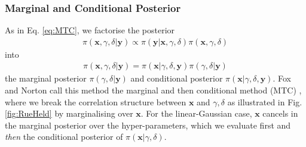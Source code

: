 \subsubsection{Marginal and Conditional Posterior}
\label{subsec:MTC}
As in Eq. \ref{eq:MTC}, we factorise the posterior
\begin{align}
	\pi( \bm{x}, \gamma, \delta| \bm{y}) \propto \pi(\bm{y}| \bm{x}, \gamma, \delta) \pi( \bm{x}, \gamma, \delta)
\end{align}
into 
\begin{align}
	\pi( \bm{x}, \gamma, \delta| \bm{y}) =\pi( \bm{x}|\gamma, \delta, \bm{y})\pi(\gamma, \delta | \bm{y})
\end{align}
the marginal posterior $\pi(\gamma, \delta | \bm{y})$ and conditional posterior $\pi( \bm{x}|\gamma, \delta, \bm{y})$.
Fox and Norton call this method the marginal and then conditional method (MTC) \cite{fox2016fast}, where we break the correlation structure between $\bm{x}$ and $\gamma, \delta$ as illustrated in Fig. \ref{fig:RueHeld} by marginalising over $\bm{x}$.
For the linear-Gaussian case, $\bm{x}$ cancels in the marginal posterior over the hyper-parameters, which we evaluate first and \textit{then} the conditional posterior of $\pi(\bm{x} | \gamma, \delta)$.

